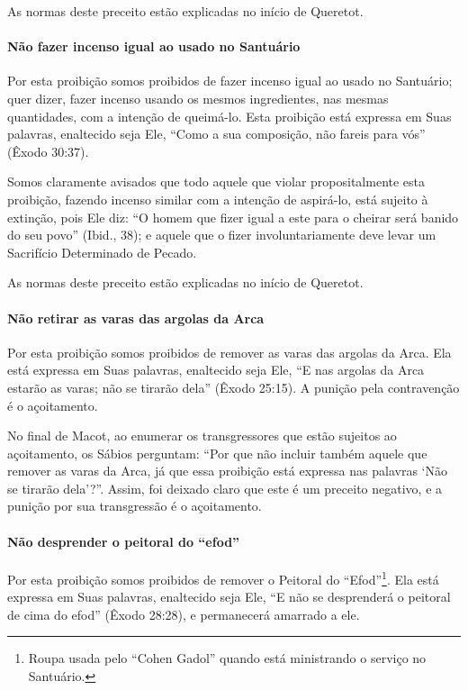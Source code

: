 As normas deste preceito estão explicadas no início de Queretot.

\paragraph{Não fazer incenso igual ao usado no Santuário}

Por esta proibição somos proibidos de fazer incenso igual ao usado no
Santuário; quer dizer, fazer incenso usando os mesmos ingredientes, nas
mesmas quantidades, com a intenção de queimá-lo. Esta proibição está
expressa em Suas palavras, enaltecido seja Ele, ``Como a sua composição,
não fareis para vós'' (Êxodo 30:37).

Somos claramente avisados que todo aquele que violar propositalmente
esta proibição, fazendo incenso similar com a intenção de aspirá-lo,
está sujeito à extinção, pois Ele diz: ``O homem que fizer igual a este
para o cheirar será banido do seu povo'' (Ibid., 38); e aquele que o
fizer involuntariamente deve levar um Sacrifício Determinado de Pecado.

As normas deste preceito estão explicadas no início de Queretot.

\paragraph{Não retirar as varas das argolas da Arca}

Por esta proibição somos proibidos de remover as varas das argolas da
Arca. Ela está expressa em Suas palavras, enaltecido seja Ele, ``E nas
argolas da Arca estarão as varas; não se tirarão dela'' (Êxodo 25:15). A
punição pela contravenção é o açoitamento.

No final de Macot, ao enumerar os transgressores que estão sujeitos ao
açoitamento, os Sábios perguntam: ``Por que não incluir também aquele
que remover as varas da Arca, já que essa proibição está expressa nas
palavras `Não se tirarão dela'?''. Assim, foi deixado claro que este é
um preceito negativo, e a punição por sua transgressão é o açoitamento.

\paragraph{Não desprender o peitoral do ``efod''}

Por esta proibição somos proibidos de remover o Peitoral do
``Efod''\footnote{Roupa usada pelo ``Cohen Gadol'' quando está ministrando o serviço
no Santuário.}. Ela está expressa em Suas palavras,
enaltecido seja Ele, ``E não se
desprenderá o peitoral de cima do efod'' (Êxodo 28:28), e permanecerá
amarrado a ele.

